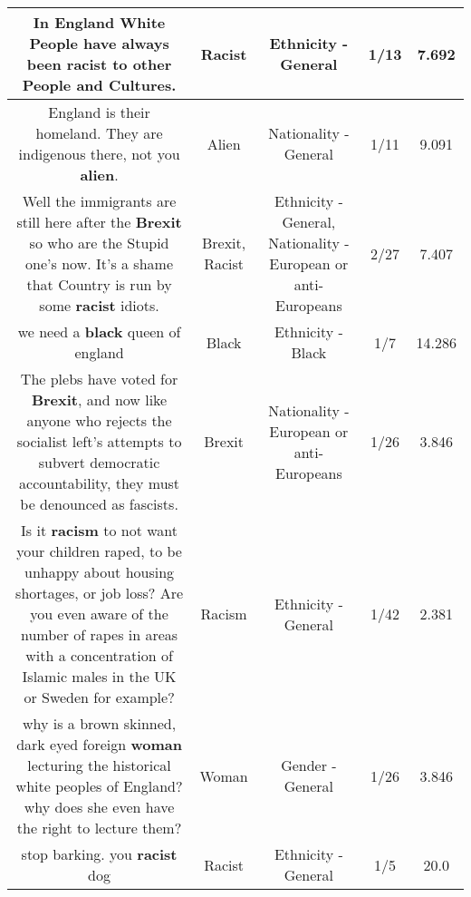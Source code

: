 \documentclass[11pt]{article}
\newlength\mylength
\begin{document}
\begin{center}
\begin{longtable}{|C{.65\mylength}|C{.30\mylength}|C{.12\mylength}|C{.12\mylength}|C{.12\mylength}|}
  \small In England White People have always been \textbf{racist} to other People and Cultures.\normalsize   & Racist & Ethnicity - General & 1/13 & 7.692 \\  \hline
  \small England is their homeland. They are indigenous there, not you \textbf{alien}.\normalsize   & Alien & Nationality - General & 1/11 & 9.091 \\  \hline
  \small Well the immigrants are still here after the \textbf{Brexit} so who are the Stupid one's now.  It's a shame that Country is run by some \textbf{racist} idiots.\normalsize   & Brexit, Racist & Ethnicity - General, Nationality - European or anti-Europeans & 2/27 & 7.407 \\  \hline
  \small we need a \textbf{black} queen of england\normalsize   & Black & Ethnicity - Black & 1/7 & 14.286 \\  \hline
  \small The plebs have voted for \textbf{Brexit}, and now like anyone who rejects the socialist left's attempts to subvert democratic accountability, they must be denounced as fascists.\normalsize   & Brexit & Nationality - European or anti-Europeans & 1/26 & 3.846 \\  \hline
  \small Is it \textbf{racism} to not want your children raped, to be unhappy about housing shortages, or job loss? Are you even aware of the number of rapes in areas with a concentration of Islamic males in the UK or Sweden for example?\normalsize   & Racism & Ethnicity - General & 1/42 & 2.381 \\  \hline
  \small why is a brown skinned, dark eyed foreign \textbf{woman} lecturing the historical white peoples of England?  why does she even have the right to lecture them?\normalsize   & Woman & Gender - General & 1/26 & 3.846 \\  \hline
  \small stop barking. you \textbf{racist} dog\normalsize   & Racist & Ethnicity - General & 1/5 & 20.0 \\  \hline

\end{longtable}
\end{center}
\end{document}

